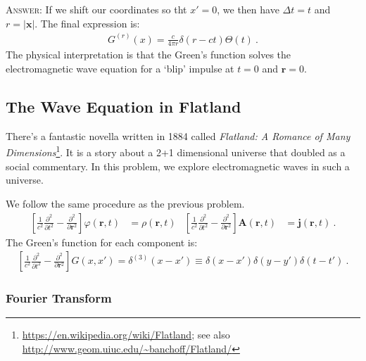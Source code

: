 \documentclass[12pt]{article}
\numberwithin{equation}{subsection}    %
\renewcommand{\vec}[1]{\mathbf{#1}} %
\begin{document}
\textsc{Answer}: If we shift our coordinates so tht $x'=0$, we then have $\Delta t = t$ and $r = |\vec x|$. The final expression is:
\begin{align}
	G^{(r)}(x) = \frac{c}{4\pi r} \delta(r-ct) \Theta(t) \ .
	\label{eq:3d:G}
\end{align}
The physical interpretation is that the Green's function solves the electromagnetic wave equation for a `blip' impulse at $t=0$ and $\vec{r} = 0$. 




 




\subsection{The Wave Equation in Flatland}

There's a fantastic novella written in 1884 called \emph{Flatland: A Romance of Many Dimensions}\footnote{\url{https://en.wikipedia.org/wiki/Flatland}; see also \url{http://www.geom.uiuc.edu/~banchoff/Flatland/}}. It is a story about a 2+1 dimensional universe that doubled as a social commentary. In this problem, we explore electromagnetic waves in such a universe. 



We follow the same procedure as the previous problem.
\begin{align}
	\left[\frac{1}{c^2}\frac{\partial^2}{\partial t^2} - \frac{\partial^2}{\partial \vec{r}^2}\right] 
	\varphi(\vec{r},t) &= \rho(\vec{r},t)
	&
	\left[\frac{1}{c^2}\frac{\partial^2}{\partial t^2} - \frac{\partial^2}{\partial \vec{r}^2}\right]
	\vec A(\vec{r},t) &= \vec j(\vec{r},t) \ .
	\label{eq:EM:wave}
\end{align}
The Green's function for each component is:
\begin{align}
	\left[\frac{1}{c^2}\frac{\partial^2}{\partial t^2} - \frac{\partial^2}{\partial \vec{r}^2}\right] G(x,x') = \delta^{(3)}(x-x') \equiv \delta(x-x')\delta(y-y')\delta(t-t') \ .
	\label{eq:HO:in:3d}
\end{align}

\subsubsection{Fourier Transform}
\end{document}
